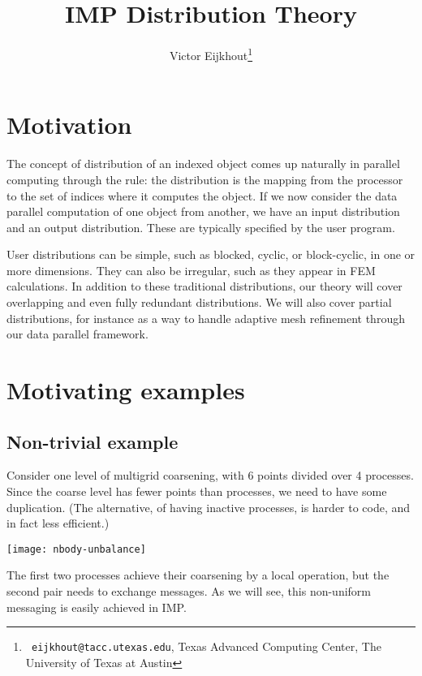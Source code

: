 \documentclass[11pt,fleqn,preprint]{impreport}
\title[IMP Distribution theory]{IMP Distribution Theory}
\author[Eijkhout]{Victor Eijkhout\thanks{{\tt
      eijkhout@tacc.utexas.edu}, Texas Advanced Computing Center, The
    University of Texas at Austin}}
\begin{document}
\maketitle

\begin{abstract}

\end{abstract}

\section{Motivation}

The concept of distribution of an indexed object comes up naturally in parallel computing
through the  rule: the distribution is the
mapping from the processor to the set of indices where it computes the
object. If we now consider the data parallel computation of one object
from another, we have an input distribution and an output
distribution. These are typically specified by the user program.

User distributions can be simple, such as blocked, cyclic, or
block-cyclic, in one or more dimensions. They can also be irregular,
such as they appear in \ac{FEM} calculations. In addition to these
traditional distributions, our theory will cover overlapping and even
fully redundant distributions. We will also cover partial
distributions, for instance as a way to handle adaptive mesh
refinement through our data parallel framework.

\section{Motivating examples}
\label{sec:threepoint-example}

\subsection{Non-trivial example}

Consider one level of multigrid coarsening, with 6 points divided over
4 processes. Since the coarse level has fewer points than processes,
we need to have some duplication. (The alternative, of having inactive
processes, is harder to code, and in fact less efficient.)

\texttt{[image: nbody-unbalance]}

The first two processes achieve their coarsening by a local operation,
but the second pair needs to exchange messages. As we will see, this
non-uniform messaging is easily achieved in \ac{IMP}.
\end{document}
